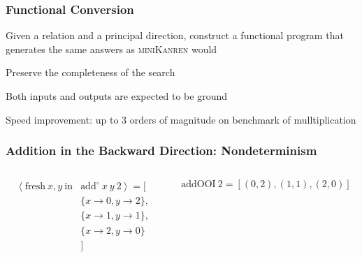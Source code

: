 \documentclass[xcolor=table, aspectratio=169]{beamer}
\newcommand{\mk}{\textsc{miniKanren}\xspace}
\begin{document}
\begin{frame}[fragile]
  \frametitle{Functional Conversion}
\begin{center}
  Given a relation and a principal direction, construct a functional program that generates the same answers as \mk would
\end{center}

\vfill

\begin{center}
  Preserve the completeness of the search
\end{center}

\vfill

\begin{center}
Both inputs and outputs are expected to be ground
\end{center}

\vfill

\begin{center}
    Speed improvement: up to $3$ orders of magnitude on benchmark of mulltiplication
\end{center}

\end{frame}

\begin{frame}[fragile]
  \frametitle{Addition in the Backward Direction: Nondeterminism}
\begin{columns}
  \begin{column}[t]{0.49\textwidth}
    
    \begin{equation*}
        \begin{split}        
        \left<\text{fresh}\ x,y\ \text{in}\right.&\left.\text{add}^{\circ}\ x\ y\ 2\right> = [\\
            &\{x \to 0, y \to 2\},\\
            &\{x \to 1, y \to 1\},\\
            &\{x \to 2, y \to 0\}\\
            &]
        \end{split}
    \end{equation*}
  \end{column}
  \begin{column}[t]{0.49\textwidth}
    
    \begin{equation*}
        \text{addOOI}\ 2 = [\left( 0, 2 \right),\left( 1, 1 \right),\left( 2, 0 \right)]
    \end{equation*}
  \end{column}
\end{columns}
\end{frame}
\end{document}
